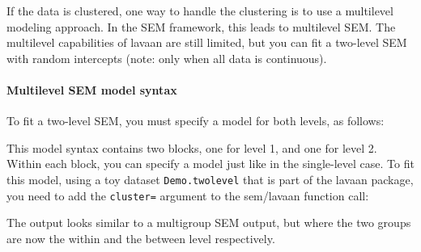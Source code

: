 If the data is clustered, one way to handle the clustering is to use a
multilevel modeling approach. In the SEM framework, this leads to
multilevel SEM. The multilevel capabilities of lavaan are still limited,
but you can fit a two-level SEM with random intercepts (note: only when
all data is continuous).

\hypertarget{multilevel-sem-model-syntax}{%
\paragraph{Multilevel SEM model
syntax}\label{multilevel-sem-model-syntax}}

To fit a two-level SEM, you must specify a model for both levels, as
follows:

\begin{Shaded}
\begin{Highlighting}[]
\OtherTok{\textless{}{-}} \StringTok{\textquotesingle{}}
\StringTok{\textquotesingle{}}
\end{Highlighting}
\end{Shaded}

This model syntax contains two blocks, one for level 1, and one for
level 2. Within each block, you can specify a model just like in the
single-level case. To fit this model, using a toy dataset
\texttt{Demo.twolevel} that is part of the lavaan package, you need to
add the \texttt{cluster=} argument to the sem/lavaan function call:

\begin{Shaded}
\begin{Highlighting}[]
\OtherTok{\textless{}{-}} \NormalTok{(} \NormalTok{)}
\end{Highlighting}
\end{Shaded}

The output looks similar to a multigroup SEM output, but where the two
groups are now the within and the between level respectively.

\begin{Shaded}
\begin{Highlighting}[]
\end{Highlighting}
\end{Shaded}

